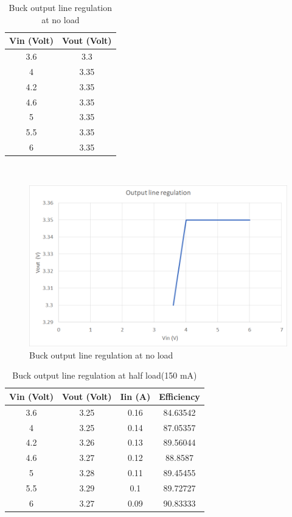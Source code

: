 \begin{table}[H]
\centering
\begin{tabular}{c c}
\toprule
Vin (Volt) & Vout (Volt) \\ \midrule\midrule
3.6        & 3.3         \\ 
4          & 3.35        \\ 
4.2        & 3.35        \\ 
4.6        & 3.35        \\ 
5          & 3.35        \\ 
5.5        & 3.35        \\ 
6          & 3.35        \\ 
\bottomrule
\end{tabular}
\caption{Buck output line regulation at no load}
\label{table:4}
\end{table}
\\
\begin{figure}[H]
	\centering
	\includegraphics[width=0.7\columnwidth]{IMGS/Buck line regulation at no load.png}
	\caption{Buck output line regulation at no load}
	\label{fig:arch}
\end{figure}
\begin{table}[H]
\centering
\begin{tabular}{c c c c}
\toprule
Vin (Volt) & Vout (Volt) & Iin (A) & Efficiency \\ \midrule\midrule
3.6        & 3.25        & 0.16    & 84.63542   \\ 
4          & 3.25        & 0.14    & 87.05357   \\ 
4.2        & 3.26        & 0.13    & 89.56044   \\ 
4.6        & 3.27        & 0.12    & 88.8587    \\ 
5          & 3.28        & 0.11    & 89.45455   \\ 
5.5        & 3.29        & 0.1     & 89.72727   \\ 
6          & 3.27        & 0.09    & 90.83333   \\ 
\bottomrule
\end{tabular}
\caption{Buck output line regulation at half load(150 mA)}
\label{table:4}
\end{table}
